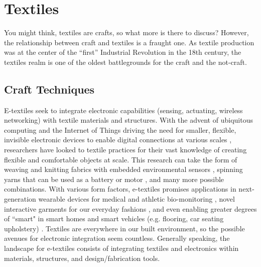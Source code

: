 \section{Textiles}

You might think, textiles are crafts, so what more is there to discuss? However, the relationship between craft and textiles is a fraught one. As textile production was at the center of the ``first'' Industrial Revolution in the 18th century, the textiles realm is one of the oldest battlegrounds for the craft and the not-craft. 

\subsection{Craft Techniques}

E-textiles seek to integrate electronic capabilities (sensing, actuating, wireless networking) with textile materials and structures. With the advent of ubiquitous computing and the Internet of Things driving the need for smaller, flexible, invisible electronic devices to enable digital connections at various scales \todo{[48]}, researchers have looked to textile practices for their vast knowledge of creating flexible and comfortable objects at scale. This research can take the form of weaving and knitting fabrics with embedded environmental sensors \todo{[1,73]}, spinning yarns that can be used as a battery or motor \todo{[87,118,144]}, and many more possible combinations. With various form factors, e-textiles promises applications in next-generation wearable devices for medical and athletic bio-monitoring \todo{[97,108]}, novel interactive garments for our everyday fashions \todo{[15,74,93]}, and even enabling greater degrees of ``smart" in smart homes and smart vehicles (e.g. flooring, car seating upholstery) \todo{[71,124]}. Textiles are everywhere in our built environment, so the possible avenues for electronic integration seem countless. Generally speaking, the landscape for e-textiles consists of integrating textiles and electronics within materials, structures, and design/fabrication tools.


